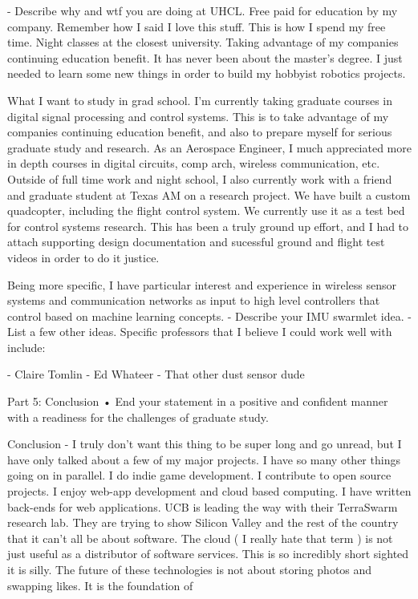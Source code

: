 \documentclass{article}
\begin{document}
    - Describe why and wtf you are doing at UHCL. Free paid for education by my company. Remember how I said 
    I love this stuff. This is how I spend my free time. Night classes at the closest university. Taking advantage of my companies continuing education benefit. It has never been about the master's degree. I just needed to learn some new things in order to build my hobbyist robotics projects.

What I want to study in grad school.
I'm currently taking graduate courses in digital signal processing and control systems. This is to take advantage
of my companies continuing education benefit, and also to prepare myself for serious graduate study and
research. As an Aerospace Engineer, I much appreciated more in depth courses in digital circuits, comp arch,
wireless communication, etc.
Outside of full time work and night school, I also currently work with a friend and graduate student at Texas AM 
on a research project. We have built a custom quadcopter, including the flight control system. We currently use it as a test bed for control systems research. This has been a truly ground up effort, and I had to attach supporting
design documentation and sucessful ground and flight test videos in order to do it justice.

Being more specific, I have particular interest and experience in wireless sensor systems and communication networks as input to high level controllers that control
    based on machine learning concepts.
    - Describe your IMU swarmlet idea.
    - List a few other ideas. Specific professors that I believe I could work well with include:

       - Claire Tomlin
       - Ed Whateer
       - That other dust sensor dude


Part 5: Conclusion
• End your statement in a positive and confident manner with a readiness for the challenges of graduate study.

Conclusion
    - I truly don't want this thing to be super long and go unread, but I have only talked about a few of my
    major projects. I have so many other things going on in parallel. I do indie game development. I contribute to open source projects. I enjoy web-app development and cloud based computing. I have written back-ends for web
    applications. UCB is leading the way with their TerraSwarm research lab. They are trying to show Silicon
    Valley and the rest of the country that it can't all be about software. The cloud ( I really hate that term )
    is not just useful as a distributor of software services. This is so incredibly short sighted it is silly. The 
    future of these technologies is not about storing photos and swapping likes. It is the foundation of  
\end{document}
